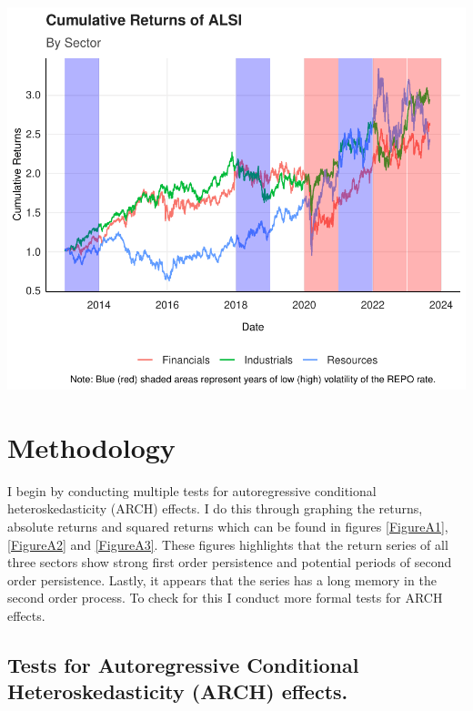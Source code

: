 \documentclass[12pt,preprint, authoryear]{elsarticle}
\let\origfigure\figure
\let\endorigfigure\endfigure
\renewenvironment{figure}[1][2] {
    \expandafter\origfigure\expandafter[H]
} {
    \endorigfigure
}
\numberwithin{equation}{section}
\numberwithin{figure}{section}
\numberwithin{table}{section}
\begin{document}
\begin{figure}[H]

{\centering \includegraphics{WriteUp_files/figure-latex/Figure1-1} 

}

\caption{Cumulative Returns of ALSI \label{Figure1}}\label{fig:Figure1}
\end{figure}

\hypertarget{methodology}{%
\section{Methodology}\label{methodology}}

I begin by conducting multiple tests for autoregressive conditional
heteroskedasticity (ARCH) effects. I do this through graphing the
returns, absolute returns and squared returns which can be found in
figures \ref{FigureA1}, \ref{FigureA2} and \ref{FigureA3}. These figures
highlights that the return series of all three sectors show strong first
order persistence and potential periods of second order persistence.
Lastly, it appears that the series has a long memory in the second order
process. To check for this I conduct more formal tests for ARCH effects.

\hypertarget{tests-for-autoregressive-conditional-heteroskedasticity-arch-effects.}{%
\subsection{Tests for Autoregressive Conditional Heteroskedasticity
(ARCH)
effects.}\label{tests-for-autoregressive-conditional-heteroskedasticity-arch-effects.}}
\end{document}
